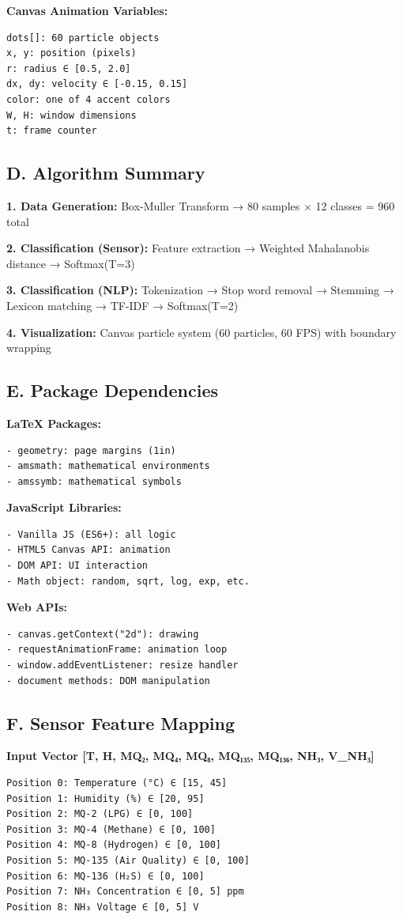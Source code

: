 \documentclass[10pt]{article}
\begin{document}
{\textbf{Canvas Animation Variables:}
\begin{verbatim}
dots[]: 60 particle objects
x, y: position (pixels)
r: radius ∈ [0.5, 2.0]
dx, dy: velocity ∈ [-0.15, 0.15]
color: one of 4 accent colors
W, H: window dimensions
t: frame counter
\end{verbatim}

\subsection*{D. Algorithm Summary}

\textbf{1. Data Generation:}
Box-Muller Transform → 80 samples × 12 classes = 960 total

\textbf{2. Classification (Sensor):}
Feature extraction → Weighted Mahalanobis distance → Softmax(T=3)

\textbf{3. Classification (NLP):}
Tokenization → Stop word removal → Stemming → Lexicon matching → TF-IDF → Softmax(T=2)

\textbf{4. Visualization:}
Canvas particle system (60 particles, 60 FPS) with boundary wrapping

\subsection*{E. Package Dependencies}

\textbf{LaTeX Packages:}
\begin{verbatim}
- geometry: page margins (1in)
- amsmath: mathematical environments
- amssymb: mathematical symbols
\end{verbatim}

\textbf{JavaScript Libraries:}
\begin{verbatim}
- Vanilla JS (ES6+): all logic
- HTML5 Canvas API: animation
- DOM API: UI interaction
- Math object: random, sqrt, log, exp, etc.
\end{verbatim}

\textbf{Web APIs:}
\begin{verbatim}
- canvas.getContext("2d"): drawing
- requestAnimationFrame: animation loop
- window.addEventListener: resize handler
- document methods: DOM manipulation
\end{verbatim}

\subsection*{F. Sensor Feature Mapping}

\textbf{Input Vector [T, H, MQ₂, MQ₄, MQ₈, MQ₁₃₅, MQ₁₃₆, NH₃, V_{NH₃}]}
\begin{verbatim}
Position 0: Temperature (°C) ∈ [15, 45]
Position 1: Humidity (%) ∈ [20, 95]
Position 2: MQ-2 (LPG) ∈ [0, 100]
Position 3: MQ-4 (Methane) ∈ [0, 100]
Position 4: MQ-8 (Hydrogen) ∈ [0, 100]
Position 5: MQ-135 (Air Quality) ∈ [0, 100]
Position 6: MQ-136 (H₂S) ∈ [0, 100]
Position 7: NH₃ Concentration ∈ [0, 5] ppm
Position 8: NH₃ Voltage ∈ [0, 5] V
\end{verbatim}

}
\end{document}
